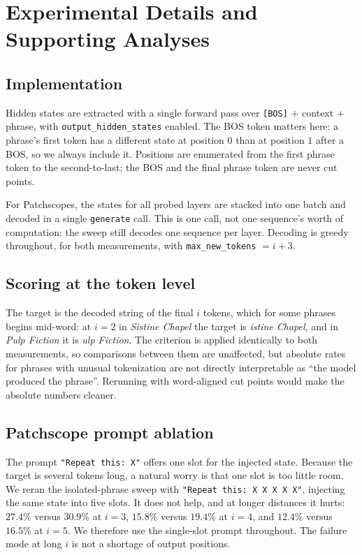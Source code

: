 \section{Experimental Details and Supporting Analyses}
\label{app:details}

\subsection{Implementation}

Hidden states are extracted with a single forward pass over \texttt{[BOS]} $+$
context $+$ phrase, with \texttt{output\_hidden\_states} enabled. The BOS token
matters here: a phrase's first token has a different state at position $0$ than
at position $1$ after a BOS, so we always include it. Positions are enumerated
from the first phrase token to the second-to-last; the BOS and the final phrase
token are never cut points.

For Patchscopes, the states for all probed layers are stacked into
one batch and decoded in a single \texttt{generate} call. This is one call, not
one sequence's worth of computation: the sweep still decodes one sequence per
layer. Decoding is greedy
throughout, for both measurements, with \texttt{max\_new\_tokens} $= i+3$.

\subsection{Scoring at the token level}

The target is the decoded string of the final $i$ tokens, which for some
phrases begins mid-word: at $i=2$ in \textit{Sistine Chapel} the target is
\textit{istine Chapel}, and in \textit{Pulp Fiction} it is \textit{ulp
Fiction}. The criterion is applied identically to both measurements, so
comparisons between them are unaffected, but absolute rates for phrases with
unusual tokenization are not directly interpretable as ``the model produced the
phrase''. Rerunning with word-aligned cut points would make the absolute
numbers cleaner.

\subsection{Patchscope prompt ablation}

The prompt \texttt{"Repeat this: X"} offers one slot for the injected state.
Because the target is several tokens long, a natural worry is that one slot is
too little room. We reran the isolated-phrase sweep with
\texttt{"Repeat this: X X X X X"}, injecting the same state into five slots.
It does not help, and at longer distances it hurts: $27.4\%$ versus $30.9\%$ at
$i=3$, $15.8\%$ versus $19.4\%$ at $i=4$, and $12.4\%$ versus $16.5\%$ at
$i=5$. We therefore use the single-slot prompt throughout. The failure mode at
long $i$ is not a shortage of output positions.

